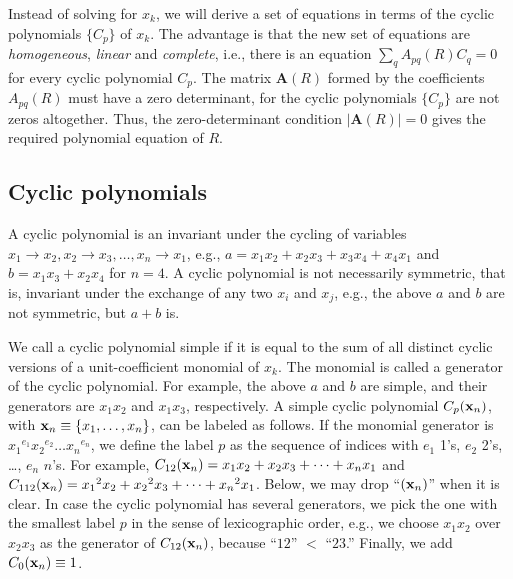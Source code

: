 \documentclass{ws-ijbc}
\begin{document}
Instead of solving  for $x_k$,
  we will derive a set of equations
  in terms of the cyclic polynomials $\{C_p\}$ of $x_k$.
%
The advantage is that the new set of equations are
  \emph{homogeneous}, \emph{linear} and \emph{complete},
  i.e., there is an equation
  $\sum_q A_{pq}(R) C_q = 0$ for every cyclic polynomial $C_p$.
%
The matrix $\mathbf A(R)$ formed by the coefficients $A_{pq}(R)$
  must have a zero determinant,
  for the cyclic polynomials $\{C_p\}$ are not zeros altogether.
%
Thus, the zero-determinant condition $|\mathbf A(R)| = 0$ gives
  the required polynomial equation of $R$.
%




\subsection{\label{sec:cyclic}Cyclic polynomials}


A cyclic polynomial is an invariant
  under the cycling of variables
  $x_1 \rightarrow x_2, x_2 \rightarrow x_3,
  \ldots, x_n \rightarrow x_1$,
  e.g., $a = x_1 x_2 + x_2 x_3 + x_3 x_4 + x_4 x_1$
  and $b = x_1 x_3 + x_2 x_4$ for $n = 4$.
%
A cyclic polynomial is not necessarily symmetric,
  that is, invariant under the exchange of any two $x_i$ and $x_{j}$,
  e.g., the above $a$ and $b$ are not symmetric, but $a + b$ is.


We call a cyclic polynomial simple
  if it is equal to the sum of
  all distinct cyclic versions of
  a unit-coefficient monomial of $x_k$.
%
The monomial is called a generator of the cyclic polynomial.
%
For example, the above $a$ and $b$ are simple,
  and their generators are $x_1 x_2$ and $x_1 x_3$, respectively.
%
A simple cyclic polynomial
  $C_p(\mathbf{x}_{n})$, with $\mathbf{x}_{n} \equiv \{x_1, \ldots, x_n\}$,
can be labeled as follows.
%
If the monomial generator is
  ${x_1}^{e_1} {x_2}^{e_2} \dots {x_n}^{e_n}$,
  we define the label $p$ as the sequence of indices with
  $e_1$ 1's, $e_2$ 2's, \ldots, $e_n$ $n$'s.
%
For example,
$C_{12}(\mathbf{x}_{n})  = x_1 x_2 + x_2 x_3 + \dots + x_n x_1$
and
$C_{112}(\mathbf{x}_{n}) = {x_1}^2 x_2 + {x_2}^2 x_3 + \dots + {x_n}^2 x_1$.
%
Below, we may drop %
  ``$(\mathbf{x}_{n})$'' when it is clear.
In case the cyclic polynomial has several generators,
  we pick the one with the smallest label $p$
  in the sense of lexicographic order,
  e.g., we choose $x_1 x_2$ over $x_2 x_3$ as the generator of $C_{12}(\mathbf{x}_{n})$,
  because ``$12$'' $<$ ``$23$.''
%
Finally, we add $C_0(\mathbf{x}_{n}) \equiv 1$.
%
%
%
\end{document}
